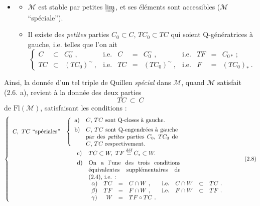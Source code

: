 \documentclass[11pt]{article}
\newcommand{\msp}[1]{\marginpar{\footnotesize [#1]}}
\newcommand{\M}{\mathcal{M}}
\newcommand{\Fl}{\mathrm{Fl}}
\begin{document}
\begin{itemize}[leftmargin=4em]
\item[(2.6)]
\begin{itemize}
\item[a)] $\M$ est stable par petites $\varinjlim$, et ses éléments sont accessibles ($\M$ “spéciale”).
\item[b)] Il existe des \textit{petites} parties $C_0 \subset C$, $TC_0 \subset TC$ qui soient Q-génératrices à gauche, i.e. telles que l'on ait
\[
\left\{
\begin{array}{rclcrclcrcl}
C & \subset & C_0^{\sim}\ , & \text{i.e.} & C & = & C_0^{\sim}\ , & \text{i.e.} & TF & = & C_{0*}\ ;\\
TC & \subset & (TC_0)^{\sim}\ , & \text{i.e.} & TC & = & (TC_0)^{\sim}\ , & \text{i.e.} & F & = & (TC_0)_*\ .
\end{array}\right. %
\]
\end{itemize}
\end{itemize}

Ainsi, la donnée d'un tel triple de Quillen \textit{spécial} dans $\M$, quand $\M$ satisfait (2.6. a), revient à la donnée des deux parties
\msp{page 15}
\[
TC \ \subset\ C
\tag*{(2.7)}
\]
de $\Fl(\M)$, satisfaisant les conditions :
\[
\left\{
\begin{array}{ll}
C,\ TC\ \text{“spéciales”} &
\left\{\begin{array}{ll}
\text{a)} & \text{$C$, $TC$ sont Q-closes à gauche.}\\[1ex]
\text{b)} & \parbox[t]{0.45\textwidth}{$C$, $TC$ sont Q-engendrées à gauche par des \textit{petites} parties $C_0$, $TC_0$ de $C$, $TC$ respectivement.}
\end{array}\right.\\[5ex]
 & \quad\ \begin{array}{ll}
\text{c)} & TC \subset W,\ TF \overset{\text{déf}}{=} C_* \subset W.\\[1ex]
\text{d)} & \parbox[t]{0.45\textwidth}{On a l'une des trois conditions équivalentes supplémentaires de (2.4), i.e. :}\\[5ex]
 & \begin{array}{lrcllrcl}
\alpha) & TC & = & C \cap W\ , & \text{i.e.} & C \cap W & \subset & TC\ .\\
\beta) & TF & = & F \cap W\ , & \text{i.e.} & F \cap W & \subset & TF\ .\\
\gamma) & W & = & TF \circ TC\ . & & & &
\end{array}
\end{array}
\end{array}\right.
\tag*{(2.8)}
\]
\end{document}
